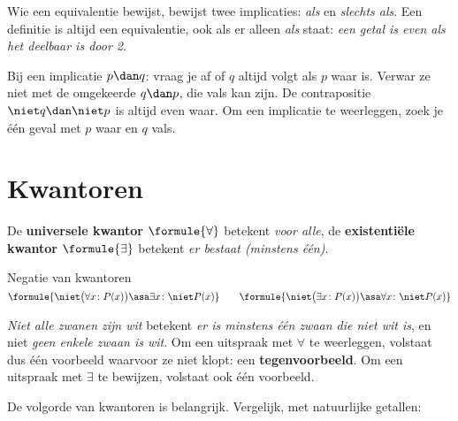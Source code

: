 Wie een equivalentie bewijst, bewijst twee implicaties: \textit{als} en \textit{slechts als}. Een definitie is altijd een equivalentie, ook als er alleen \textit{als} staat: \textit{een getal is even als het deelbaar is door 2}.

\begin{werkwijze}
Bij een implicatie $p \dan q$: vraag je af of $q$ altijd volgt als $p$ waar is. Verwar ze niet met de omgekeerde $q \dan p$, die vals kan zijn. De contrapositie $\niet q \dan \niet p$ is altijd even waar. Om een implicatie te weerleggen, zoek je één geval met $p$ waar en $q$ vals.
\end{werkwijze}

\begin{oefeningen}

\end{oefeningen}

\section{Kwantoren}

\begin{theorie}
De \textbf{\textcolor{accent}{universele kwantor}} $\formule{\forall}$ betekent \textit{voor alle}, de \textbf{\textcolor{accent}{existentiële kwantor}} $\formule{\exists}$ betekent \textit{er bestaat (minstens één)}.

\begin{stelling}{Negatie van kwantoren}
\qquad $\formule{\niet\bigl(\forall x\colon P(x)\bigr) \asa \exists x\colon \niet P(x)} \qquad \formule{\niet\bigl(\exists x\colon P(x)\bigr) \asa \forall x\colon \niet P(x)}$
\end{stelling}
\end{theorie}

\textit{Niet alle zwanen zijn wit} betekent \textit{er is minstens één zwaan die niet wit is}, en niet \textit{geen enkele zwaan is wit}. Om een uitspraak met $\forall$ te weerleggen, volstaat dus één voorbeeld waarvoor ze niet klopt: een \textbf{tegenvoorbeeld}. Om een uitspraak met $\exists$ te bewijzen, volstaat ook één voorbeeld.

De volgorde van kwantoren is belangrijk. Vergelijk, met natuurlijke getallen:


